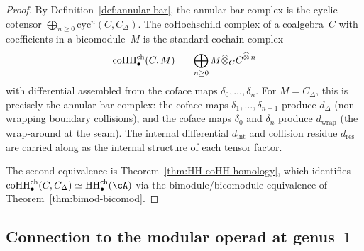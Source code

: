 \begin{proof}
By Definition~\ref{def:annular-bar}, the annular bar complex
is the cyclic cotensor
$\bigoplus_{n\ge 0}\mathrm{cyc}^n(C,C_\Delta)$.
The coHochschild complex of a coalgebra~$C$ with coefficients in a
bicomodule~$M$ is the standard cochain complex
\[
\operatorname{coHH}^{\mathrm{ch}}_\bullet(C,M)
\;=\;
\bigoplus_{n\ge 0}
M\widehat{\otimes}_C C^{\widehat\otimes\,n}
\]
with differential assembled from the coface maps $\delta_0,\ldots,\delta_n$.
For $M=C_\Delta$, this is precisely the
annular bar complex: the coface maps $\delta_1,\ldots,\delta_{n-1}$
produce $d_\Delta$ (non-wrapping boundary collisions), and the
coface maps $\delta_0$ and $\delta_n$ produce $d_{\mathrm{wrap}}$
(the wrap-around at the seam). The internal differential $d_{\mathrm{int}}$
and collision residue $d_{\mathrm{res}}$ are carried along as the
internal structure of each tensor factor.

The second equivalence is
Theorem~\ref{thm:HH-coHH-homology}, which identifies
$\coHoch^{\mathrm{ch}}_\bullet(C,C_\Delta)\simeq
\HH^{\mathrm{ch}}_\bullet(\cA)$ via the bimodule/bicomodule
equivalence of Theorem~\ref{thm:bimod-bicomod}.
\end{proof}

\subsection{Connection to the modular operad at genus~$1$}

